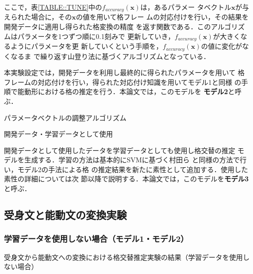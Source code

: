 \documentclass[japanese]{jnlp_1.4}
\renewcommand{\paragraph}{}
\begin{document}
    ここで，表\ref{TABLE::TUNE}中の$f_{accuracy}(\mathbf{x})$は，あるパラメー
    タベクトル$\mathbf{x}$が与えられた場合に，その$\mathbf{x}$の値を用いて格フレー
    ムの対応付けを行い，その結果を開発データに適用し得られた格変換の精度
    を返す関数である．このアルゴリズムはパラメータを1つずつ順に0.1刻みで
    更新していき，$f_\mathit{accuracy}(\mathbf{x})$が大きくなるようにパラメータを更
    新していくという手順を，$f_\mathit{accuracy}(\mathbf{x})$の値に変化がなくなるま
    で繰り返す山登り法に基づくアルゴリズムとなっている．
    
    本実験設定では，開発データを利用し最終的に得られたパラメータを用いて
    格フレームの対応付けを行い，得られた対応付け知識を用いてモデル1と同様
    の手順で能動形における格の推定を行う．本論文では，このモデルを
    \textbf{モデル2}と呼ぶ．
  
    \begin{table}[b]
     \caption{パラメータベクトルの調整アルゴリズム}
     \label{TABLE::TUNE}

    \end{table}
    

\paragraph{
開発データ・学習データとして使用}

    開発データとして使用したデータを学習データとしても使用し格交替の推定
    モデルを生成する．学習の方法は基本的にSVMに基づく村田ら
    \cite{Murata2002,Murata2008}と同様の方法で行い，モデル2の手法による格
    の推定結果を新たに素性として追加する．使用した素性の詳細については次
    節以降で説明する．本論文では，このモデルを\textbf{モデル3}と呼ぶ．


  \subsection{受身文と能動文の変換実験}
  
   \subsubsection{学習データを使用しない場合（モデル1・モデル2）}

   \begin{table}[b]
    \caption{受身文から能動文への変換における格交替推定実験の結果（学習データを使用しない場合）}
\label{TABLE::RESULT1}

   \end{table}
\end{document}

